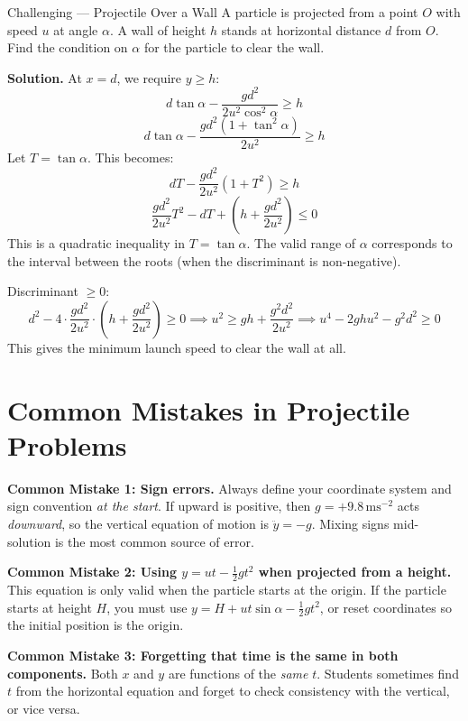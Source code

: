 \documentclass[12pt, a4paper]{book}
\newcommand{\mss}{\,\mathrm{ms}^{-2}}
\begin{document}
\begin{exmp}{Challenging --- Projectile Over a Wall}{}
A particle is projected from a point $O$ with speed $u$ at angle $\alpha$. A wall of height $h$ stands at horizontal distance $d$ from $O$. Find the condition on $\alpha$ for the particle to clear the wall.

\medskip
\textbf{Solution.} At $x = d$, we require $y \geq h$:
\[
  d\tan\alpha - \frac{gd^2}{2u^2\cos^2\alpha} \geq h
\]
\[
  d\tan\alpha - \frac{gd^2(1+\tan^2\alpha)}{2u^2} \geq h
\]
Let $T = \tan\alpha$. This becomes:
\[
  dT - \frac{gd^2}{2u^2}(1 + T^2) \geq h
\]
\[
  \frac{gd^2}{2u^2}T^2 - dT + \left(h + \frac{gd^2}{2u^2}\right) \leq 0
\]
This is a quadratic inequality in $T = \tan\alpha$. The valid range of $\alpha$ corresponds to the interval between the roots (when the discriminant is non-negative).

Discriminant $\geq 0$:
\[
  d^2 - 4\cdot\frac{gd^2}{2u^2}\cdot\left(h + \frac{gd^2}{2u^2}\right) \geq 0
  \implies u^2 \geq gh + \frac{g^2d^2}{2u^2}
  \implies u^4 - 2ghu^2 - g^2d^2 \geq 0
\]
This gives the minimum launch speed to clear the wall at all.
\end{exmp}

\section{Common Mistakes in Projectile Problems}

\begin{warningbox}
\textbf{Common Mistake 1: Sign errors.}
Always define your coordinate system and sign convention \emph{at the start}. If upward is positive, then $g = +9.8\mss$ acts \emph{downward}, so the vertical equation of motion is $\ddot{y} = -g$. Mixing signs mid-solution is the most common source of error.
\end{warningbox}

\begin{warningbox}
\textbf{Common Mistake 2: Using $y = ut - \frac{1}{2}gt^2$ when projected from a height.}
This equation is only valid when the particle starts at the origin. If the particle starts at height $H$, you must use $y = H + ut\sin\alpha - \frac{1}{2}gt^2$, or reset coordinates so the initial position is the origin.
\end{warningbox}

\begin{warningbox}
\textbf{Common Mistake 3: Forgetting that time is the same in both components.}
Both $x$ and $y$ are functions of the \emph{same} $t$. Students sometimes find $t$ from the horizontal equation and forget to check consistency with the vertical, or vice versa.
\end{warningbox}
\end{document}
